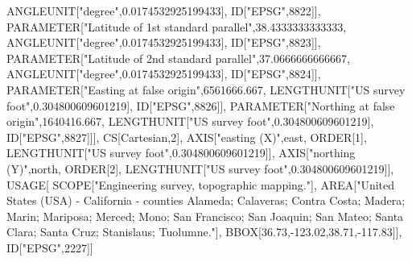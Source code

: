 \documentclass[
]{krantz}
\makeatletter
\newenvironment{Shaded}{\begin{snugshade}}{\end{snugshade}}
\newcommand{\DecValTok}[1]{\textcolor[rgb]{0.06,0.06,0.06}{#1}}
\newcommand{\FloatTok}[1]{\textcolor[rgb]{0.06,0.06,0.06}{#1}}
\newcommand{\NormalTok}[1]{#1}
\newcommand{\SpecialCharTok}[1]{\textcolor[rgb]{0,0,0}{#1}}
\newcommand{\StringTok}[1]{\textcolor[rgb]{0.5,0.5,0.5}{#1}}
\newenvironment{kframe}{%
\medskip{}
\setlength{\fboxsep}{.8em}
 \def\at@end@of@kframe{}%
 \ifinner\ifhmode%
  \def\at@end@of@kframe{\end{minipage}}%
  \begin{minipage}{\columnwidth}%
 \fi\fi%
 \def\FrameCommand##1{\hskip\@totalleftmargin \hskip-\fboxsep
 \colorbox{shadecolor}{##1}\hskip-\fboxsep
     \hskip-\linewidth \hskip-\@totalleftmargin \hskip\columnwidth}%
 \MakeFramed {\advance\hsize-\width
   \@totalleftmargin\z@ \linewidth\hsize
   \@setminipage}}%
 {\par\unskip\endMakeFramed%
 \at@end@of@kframe}
\renewenvironment{Shaded}{\begin{kframe}}{\end{kframe}}
\makeatother
\begin{document}
\begin{Shaded}
\begin{Highlighting}[]
\NormalTok{            ANGLEUNIT[}\StringTok{"degree"}\NormalTok{,}\FloatTok{0.0174532925199433}\NormalTok{],}
\NormalTok{            ID[}\StringTok{"EPSG"}\NormalTok{,}\DecValTok{8822}\NormalTok{]],}
\NormalTok{        PARAMETER[}\StringTok{"Latitude of 1st standard parallel"}\NormalTok{,}\FloatTok{38.4333333333333}\NormalTok{,}
\NormalTok{            ANGLEUNIT[}\StringTok{"degree"}\NormalTok{,}\FloatTok{0.0174532925199433}\NormalTok{],}
\NormalTok{            ID[}\StringTok{"EPSG"}\NormalTok{,}\DecValTok{8823}\NormalTok{]],}
\NormalTok{        PARAMETER[}\StringTok{"Latitude of 2nd standard parallel"}\NormalTok{,}\FloatTok{37.0666666666667}\NormalTok{,}
\NormalTok{            ANGLEUNIT[}\StringTok{"degree"}\NormalTok{,}\FloatTok{0.0174532925199433}\NormalTok{],}
\NormalTok{            ID[}\StringTok{"EPSG"}\NormalTok{,}\DecValTok{8824}\NormalTok{]],}
\NormalTok{        PARAMETER[}\StringTok{"Easting at false origin"}\NormalTok{,}\FloatTok{6561666.667}\NormalTok{,}
\NormalTok{            LENGTHUNIT[}\StringTok{"US survey foot"}\NormalTok{,}\FloatTok{0.304800609601219}\NormalTok{],}
\NormalTok{            ID[}\StringTok{"EPSG"}\NormalTok{,}\DecValTok{8826}\NormalTok{]],}
\NormalTok{        PARAMETER[}\StringTok{"Northing at false origin"}\NormalTok{,}\FloatTok{1640416.667}\NormalTok{,}
\NormalTok{            LENGTHUNIT[}\StringTok{"US survey foot"}\NormalTok{,}\FloatTok{0.304800609601219}\NormalTok{],}
\NormalTok{            ID[}\StringTok{"EPSG"}\NormalTok{,}\DecValTok{8827}\NormalTok{]]],}
\NormalTok{    CS[Cartesian,}\DecValTok{2}\NormalTok{],}
\NormalTok{        AXIS[}\StringTok{"easting (X)"}\NormalTok{,east,}
\NormalTok{            ORDER[}\DecValTok{1}\NormalTok{],}
\NormalTok{            LENGTHUNIT[}\StringTok{"US survey foot"}\NormalTok{,}\FloatTok{0.304800609601219}\NormalTok{]],}
\NormalTok{        AXIS[}\StringTok{"northing (Y)"}\NormalTok{,north,}
\NormalTok{            ORDER[}\DecValTok{2}\NormalTok{],}
\NormalTok{            LENGTHUNIT[}\StringTok{"US survey foot"}\NormalTok{,}\FloatTok{0.304800609601219}\NormalTok{]],}
\NormalTok{    USAGE[}
\NormalTok{        SCOPE[}\StringTok{"Engineering survey, topographic mapping."}\NormalTok{],}
\NormalTok{        AREA[}\StringTok{"United States (USA) {-} California {-} counties Alameda; Calaveras; Contra Costa; Madera; Marin; Mariposa; Merced; Mono; San Francisco; San Joaquin; San Mateo; Santa Clara; Santa Cruz; Stanislaus; Tuolumne."}\NormalTok{],}
\NormalTok{        BBOX[}\FloatTok{36.73}\NormalTok{,}\SpecialCharTok{{-}}\FloatTok{123.02}\NormalTok{,}\FloatTok{38.71}\NormalTok{,}\SpecialCharTok{{-}}\FloatTok{117.83}\NormalTok{]],}
\NormalTok{    ID[}\StringTok{"EPSG"}\NormalTok{,}\DecValTok{2227}\NormalTok{]]}
\end{Highlighting}
\end{Shaded}
\end{document}
